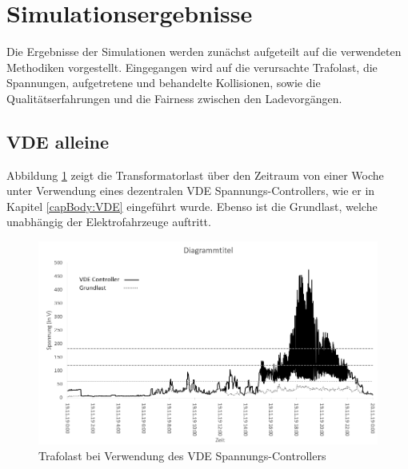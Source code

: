 \section{Simulationsergebnisse}
Die Ergebnisse der Simulationen werden zunächst aufgeteilt auf die verwendeten Methodiken vorgestellt. Eingegangen wird auf die verursachte Trafolast, die Spannungen, aufgetretene und behandelte Kollisionen, sowie die Qualitätserfahrungen und die Fairness zwischen den Ladevorgängen. 
\subsection{VDE alleine}
Abbildung \ref{Abb_VDEtauTrafoLast} zeigt die Transformatorlast über den Zeitraum von einer Woche unter Verwendung eines dezentralen VDE Spannungs-Controllers, wie er in Kapitel \ref{capBody:VDE} eingeführt wurde. Ebenso ist die Grundlast, welche unabhängig der Elektrofahrzeuge auftritt.
\begin{figure}[htb]
\centering
	\includegraphics[scale=0.7]{img/VDE_tau/TrafoLast6.png}
	\caption{Trafolast bei Verwendung des VDE Spannungs-Controllers}
	\label{Abb_VDEtauTrafoLast}
\end{figure}

